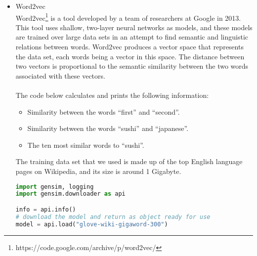 \begin{itemize}
\item Word2vec\\
Word2vec\footnote{https://code.google.com/archive/p/word2vec/} is a tool developed by a team of researchers at Google in 2013. This tool uses shallow, two-layer neural networks as models, and these models are trained over large data sets in an attempt to find semantic and linguistic relations between words. Word2vec produces a vector space that represents the data set, each words being a vector in this space. The distance between two vectors is proportional to the semantic similarity between the two words associated with these vectors.\\\\
The code below calculates and prints the following information:
\begin{itemize}
\item Similarity between the words ``first'' and ``second''.
\item Similarity between the words ``sushi'' and ``japanese''.
\item The ten most similar words to ``sushi''.
\end{itemize}
The training data set that we used is made up of the top English language pages on Wikipedia, and its size is around 1 Gigabyte.\\
\begin{lstlisting}[language=Python]
import gensim, logging
import gensim.downloader as api

info = api.info()
# download the model and return as object ready for use
model = api.load("glove-wiki-gigaword-300")  


\end{lstlisting}
\end{itemize}
